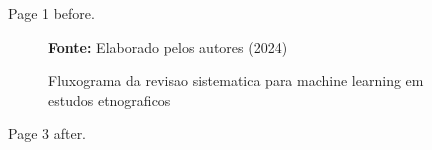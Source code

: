 \documentclass[brazil,msc]{ppgpi-abntex2}
\begin{document}
Page 1 before.
\begin{landscape}
\begin{figure}[H]
  \centering
  \caption{Fluxograma da revisao sistematica para machine learning em estudos etnograficos}
  \par\small\textbf{Fonte:} Elaborado pelos autores (2024)
  \label{fig:test2}
\end{figure}
\end{landscape}
Page 3 after.
\end{document}
